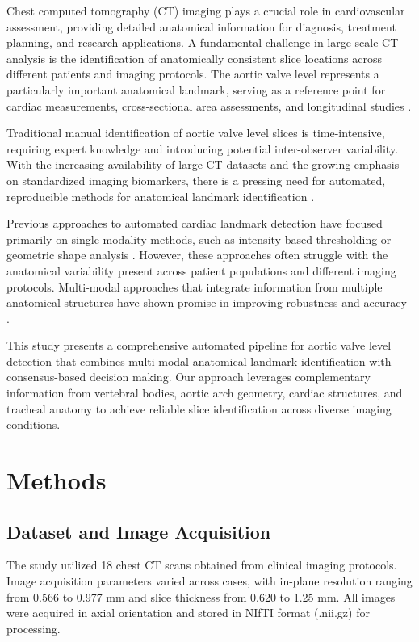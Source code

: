 \documentclass[11pt,a4paper]{article}
\begin{document}
Chest computed tomography (CT) imaging plays a crucial role in cardiovascular assessment, providing detailed anatomical information for diagnosis, treatment planning, and research applications. A fundamental challenge in large-scale CT analysis is the identification of anatomically consistent slice locations across different patients and imaging protocols. The aortic valve level represents a particularly important anatomical landmark, serving as a reference point for cardiac measurements, cross-sectional area assessments, and longitudinal studies \cite{ref1,ref2}.

Traditional manual identification of aortic valve level slices is time-intensive, requiring expert knowledge and introducing potential inter-observer variability. With the increasing availability of large CT datasets and the growing emphasis on standardized imaging biomarkers, there is a pressing need for automated, reproducible methods for anatomical landmark identification \cite{ref3,ref4}.

Previous approaches to automated cardiac landmark detection have focused primarily on single-modality methods, such as intensity-based thresholding or geometric shape analysis \cite{ref5,ref6}. However, these approaches often struggle with the anatomical variability present across patient populations and different imaging protocols. Multi-modal approaches that integrate information from multiple anatomical structures have shown promise in improving robustness and accuracy \cite{ref7,ref8}.

This study presents a comprehensive automated pipeline for aortic valve level detection that combines multi-modal anatomical landmark identification with consensus-based decision making. Our approach leverages complementary information from vertebral bodies, aortic arch geometry, cardiac structures, and tracheal anatomy to achieve reliable slice identification across diverse imaging conditions.

\section{Methods}

\subsection{Dataset and Image Acquisition}

The study utilized 18 chest CT scans obtained from clinical imaging protocols. Image acquisition parameters varied across cases, with in-plane resolution ranging from 0.566 to 0.977 mm and slice thickness from 0.620 to 1.25 mm. All images were acquired in axial orientation and stored in NIfTI format (.nii.gz) for processing.
\end{document}
